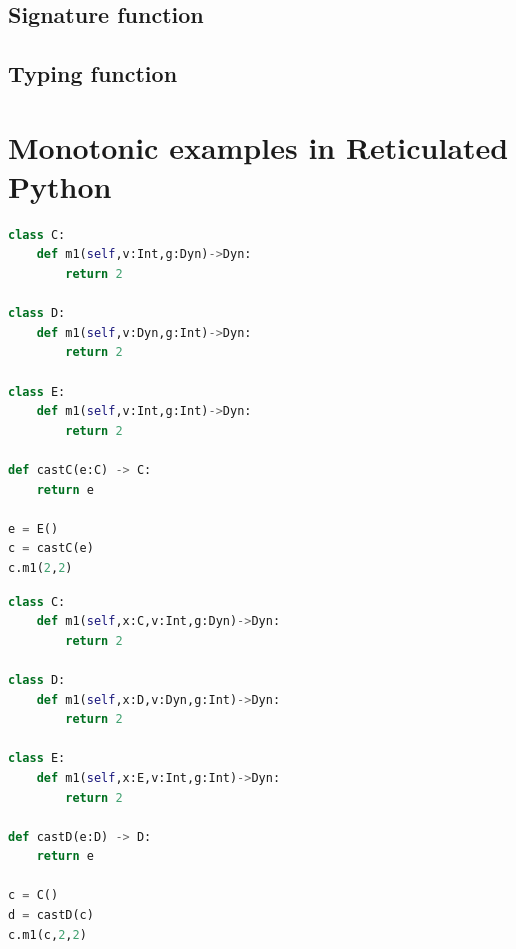 \documentclass[a4paper,USenglish]{tex/lipics-v2016}
\begin{document}
\subsection{Signature function}

\begin{mathpar}



\end{mathpar}

\subsection{Typing function}

\begin{mathpar}
\end{mathpar}

\section{Monotonic examples in Reticulated Python}

\begin{lstlisting}[language=python]
class C:
	def m1(self,v:Int,g:Dyn)->Dyn:
		return 2

class D:
	def m1(self,v:Dyn,g:Int)->Dyn:
		return 2

class E:
	def m1(self,v:Int,g:Int)->Dyn:
		return 2

def castC(e:C) -> C:
	return e

e = E()
c = castC(e)
c.m1(2,2)
\end{lstlisting}


\begin{lstlisting}[language=python]
class C:
	def m1(self,x:C,v:Int,g:Dyn)->Dyn:
		return 2

class D:
	def m1(self,x:D,v:Dyn,g:Int)->Dyn:
		return 2

class E:
	def m1(self,x:E,v:Int,g:Int)->Dyn:
		return 2

def castD(e:D) -> D:
	return e

c = C()
d = castD(c)
c.m1(c,2,2)
\end{lstlisting}
\end{document}
